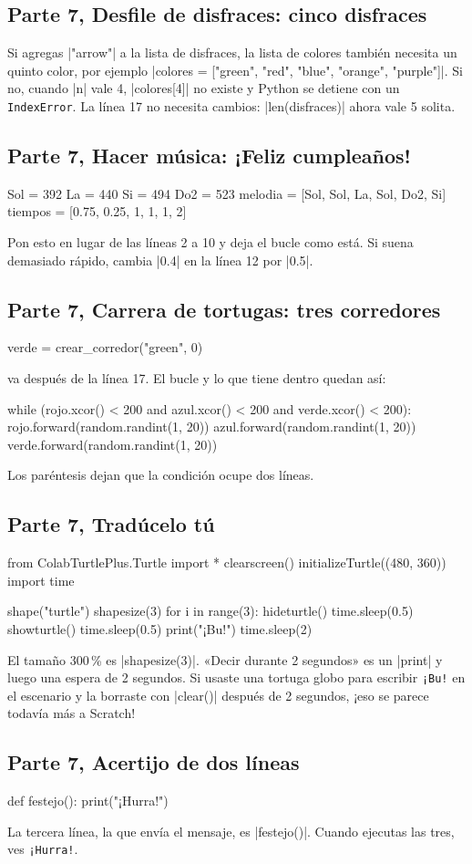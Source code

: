 \subsection*{Parte 7, Desfile de disfraces: cinco disfraces}
Si agregas \py|"arrow"| a la lista de disfraces, la lista de colores también necesita un quinto color, por ejemplo \py|colores = ["green", "red", "blue", "orange", "purple"]|. Si no, cuando \py|n| vale 4, \py|colores[4]| no existe y Python se detiene con un \texttt{IndexError}. La línea 17 no necesita cambios: \py|len(disfraces)| ahora vale 5 solita.

\subsection*{Parte 7, Hacer música: ¡Feliz cumpleaños!}
\begin{codenonum}
Sol = 392
La = 440
Si = 494
Do2 = 523
melodia = [Sol, Sol, La, Sol, Do2, Si]
tiempos = [0.75, 0.25, 1, 1, 1, 2]
\end{codenonum}
Pon esto en lugar de las líneas 2 a 10 y deja el bucle como está. Si suena demasiado rápido, cambia \py|0.4| en la línea 12 por \py|0.5|.

\subsection*{Parte 7, Carrera de tortugas: tres corredores}
\begin{codenonum}
verde = crear_corredor("green", 0)
\end{codenonum}
va después de la línea 17. El bucle y lo que tiene dentro quedan así:
\begin{codenonum}
while (rojo.xcor() < 200 and azul.xcor() < 200
       and verde.xcor() < 200):
    rojo.forward(random.randint(1, 20))
    azul.forward(random.randint(1, 20))
    verde.forward(random.randint(1, 20))
\end{codenonum}
Los paréntesis dejan que la condición ocupe dos líneas.

\subsection*{Parte 7, Tradúcelo tú}
\begin{codenonum}
from ColabTurtlePlus.Turtle import *
clearscreen()
initializeTurtle((480, 360))
import time

shape("turtle")
shapesize(3)
for i in range(3):
    hideturtle()
    time.sleep(0.5)
    showturtle()
    time.sleep(0.5)
print("¡Bu!")
time.sleep(2)
\end{codenonum}
El tamaño 300\,\% es \py|shapesize(3)|. «Decir durante 2 segundos» es un \py|print| y luego una espera de 2 segundos. Si usaste una tortuga globo para escribir \texttt{¡Bu!} en el escenario y la borraste con \py|clear()| después de 2 segundos, ¡eso se parece todavía más a Scratch!

\subsection*{Parte 7, Acertijo de dos líneas}
\begin{codenonum}
def festejo():
    print("¡Hurra!")
\end{codenonum}
La tercera línea, la que envía el mensaje, es \py|festejo()|. Cuando ejecutas las tres, ves \texttt{¡Hurra!}.
